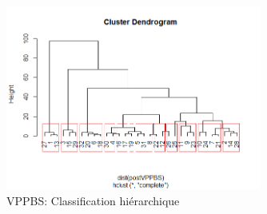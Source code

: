 \begin{figure}[H]
\centering
\includegraphics[width=0.75\textwidth]{../Fig/VPPBS/vppbs-cah-k12-post.png}
\caption{VPPBS: Classification hiérarchique}
\end{figure}

%
